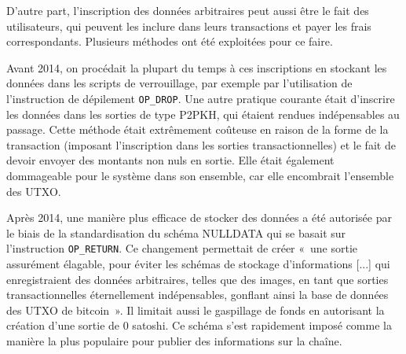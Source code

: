 D'autre part, l'inscription des données arbitraires peut aussi être le fait des utilisateurs, qui peuvent les inclure dans leurs transactions et payer les frais correspondants. Plusieurs méthodes ont été exploitées pour ce faire.

Avant 2014, on procédait la plupart du temps à ces inscriptions en stockant les données dans les scripts de verrouillage, par exemple par l'utilisation de l'instruction de dépilement \texttt{OP\_DROP}. Une autre pratique courante était d'inscrire les données dans les sorties de type P2PKH, qui étaient rendues indépensables au passage. Cette méthode était extrêmement coûteuse en raison de la forme de la transaction (imposant l'inscription dans les sorties transactionnelles) et le fait de devoir envoyer des montants non nuls en sortie. Elle était également dommageable pour le système dans son ensemble, car elle encombrait l'ensemble des UTXO.

Après 2014, une manière plus efficace de stocker des données a été autorisée par le biais de la standardisation du schéma NULLDATA qui se basait sur l'instruction \texttt{OP\_RETURN}. Ce changement permettait de créer «~une sortie assurément élagable, pour éviter les schémas de stockage d'informations [...] qui enregistraient des données arbitraires, telles que des images, en tant que sorties transactionnelles éternellement indépensables, gonflant ainsi la base de données des UTXO de bitcoin~». Il limitait aussi le gaspillage de fonds en autorisant la création d'une sortie de 0 satoshi. Ce schéma s'est rapidement imposé comme la manière la plus populaire pour publier des informations sur la chaîne. %

